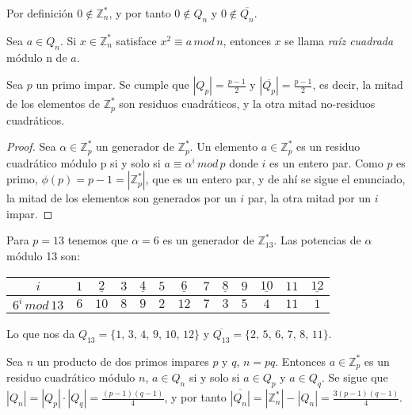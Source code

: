 \begin{remark}
	Por definición $0 \notin \mathbb{Z}^*_n$, y por tanto $0 \notin Q_n$ y $0 \notin \overline{Q_n}$.
\end{remark}



\begin{definition}
	Sea $a \in Q_n$. Si $x \in \mathbb{Z}^*_n$ satisface $ x^2 \equiv a \, mod \, n$, entonces $x$ se llama \textit{raíz cuadrada} módulo n de $a$.
\end{definition}



\begin{proposition}
	Sea $p$ un primo impar. Se cumple que $|Q_p| = \frac{p-1}{2}$ y $|\overline{Q_p}| = \frac{p-1}{2}$, es decir, la mitad de los elementos de $\mathbb{Z}^*_p$ son residuos cuadráticos, y la otra mitad no-residuos cuadráticos.
\end{proposition}

\begin{proof}
	Sea $\alpha \in \mathbb{Z}^*_p$ un generador de $\mathbb{Z}^*_p$.
	Un elemento $a \in \mathbb{Z}^*_p$ es un residuo cuadrático módulo p si y solo si $a \equiv \alpha^i \, mod \, p$ donde $i$ es un entero par. Como $p$ es primo, $\phi(p) = p-1 = |\mathbb{Z}^*_p|$, que es un entero par, y de ahí se sigue el enunciado, la mitad de los elementos son generados por un $i$ par, la otra mitad por un $i$ impar.
\end{proof}

\begin{example}
	Para $p=13$ tenemos que $\alpha = 6$ es un generador de $\mathbb{Z}^*_{13}$. Las potencias de $\alpha$ módulo 13 son:
	
	\begin{tabular}{|c||c|c|c|c|c|c|c|c|c|c|c|c|}
		 \hline
			$i$ & $1$ & $\underline{2}$ & $3$ & $\underline{4}$ & $5$ & $\underline{6}$ & $7$ & $\underline{8}$ & $9$ & $\underline{10}$ & $11$ & $\underline{12}$ \\
			\hline
			$6^i \, mod \, 13$ & $6$ & $10$ & $8$ & $9$ & $2$ & $12$ & $7$ & $3$ & $5$ & $4$ & $11$ & $1$ \\
		 \hline
	\end{tabular}

	\hfil

	Lo que nos da $Q_{13} = \{1,\,3,\,4,\,9,\,10,\,12\}$ y $\overline{Q_{13}} = \{2,\,5,\,6,\,7,\,8,\,11\}$.
\end{example}

\begin{proposition}
	Sea $n$ un producto de dos primos impares $p$ y $q$, $n = pq$. Entonces  $a \in \mathbb{Z}^*_p$ es un residuo cuadrático módulo $n$, $a \in Q_n$ si y solo si $a \in Q_p$ y $a \in Q_q$. Se sigue que $|Q_n| = |Q_p|\cdot |Q_q| = \frac{(p-1)(q-1)}{4}$, y por tanto  $\overline{|Q_n|} = |\mathbb{Z}^*_n| - |Q_n| = \frac{3(p-1)(q-1)}{4}$.
\end{proposition}


